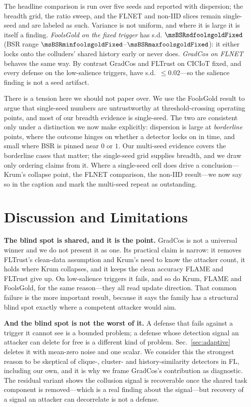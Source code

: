 The headline comparison is run over five seeds and reported with dispersion;
the breadth grid, the ratio sweep, and the FLNET and non-IID slices remain
single-seed and are labeled as such. Variance is not uniform, and where it is
large it is itself a finding. \emph{FoolsGold on the fixed trigger} has s.d.
$\msBSRsdfoolsgoldFixed$ (BSR range
$\msBSRminfoolsgoldFixed$--$\msBSRmaxfoolsgoldFixed$): it either locks onto the colluders' shared
history early or never does. \emph{GradCos on FLNET} behaves the same way. By
contrast GradCos and FLTrust on CICIoT fixed, and every defense on the
low-salience triggers, have s.d.\ $\leq0.02$---so the salience finding is not a
seed artifact.

There is a tension here we should not paper over. We use the FoolsGold result to
argue that single-seed numbers are untrustworthy at threshold-crossing operating
points, and most of our breadth evidence is single-seed. The two are consistent
only under a distinction we now make explicitly: dispersion is large at
\emph{borderline} points, where the outcome hinges on whether a detector locks on
in time, and small where BSR is pinned near $0$ or $1$. Our multi-seed evidence
covers the borderline cases that matter; the single-seed grid supplies breadth,
and we draw only ordering claims from it. Where a single-seed cell does drive a
conclusion---Krum's collapse point, the FLNET comparison, the non-IID result---we
now say so in the caption and mark the multi-seed repeat as outstanding.

\section{Discussion and Limitations}

\textbf{The blind spot is shared, and it is the point.} GradCos is not a
universal winner and we do not present it as one. Its practical claim is narrow:
it removes FLTrust's clean-data assumption and Krum's need to know the attacker
count, it holds where Krum collapses, and it keeps the clean accuracy FLAME and
FLTrust give up. On low-salience triggers it fails, and so do Krum, FLAME and
FoolsGold, for the same reason---they all read update direction. That common
failure is the more important result, because it says the family has a structural
blind spot exactly where a competent attacker would aim.

\textbf{And the blind spot is not the worst of it.} A defense that fails against
a trigger it cannot see is a bounded problem; a defense whose detection signal an
attacker can delete for free is a different kind of problem.
Sec.~\ref{sec:adaptive} deletes it with mean-zero noise and one scalar. We
consider this the strongest reason to be skeptical of clique-, cluster- and
history-similarity detectors in FL, including our own, and it is why we frame
GradCos's contribution as diagnostic. The residual variant shows the collusion
signal is recoverable once the shared task component is removed---which is a real
finding about the signal---but recovery of a signal an attacker can decorrelate
is not a defense.

